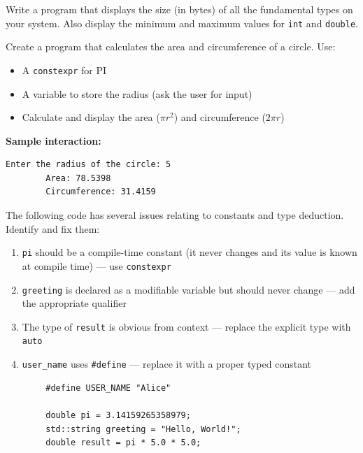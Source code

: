\begin{example}{\leavevmode}
	
	Write a program that displays the size (in bytes) of all the fundamental types on your system. Also display the minimum and maximum values for \texttt{int} and \texttt{double}.
\end{example}

\begin{example}{\leavevmode}
	
	Create a program that calculates the area and circumference of a circle. Use:
	\begin{itemize}
		\item A \texttt{constexpr} for PI
		\item A variable to store the radius (ask the user for input)
		\item Calculate and display the area ($\pi r^2$) and circumference ($2\pi r$)
	\end{itemize}
	
	\textbf{Sample interaction:}
	\begin{lstlisting}[numbers=none]
		Enter the radius of the circle: 5
		Area: 78.5398
		Circumference: 31.4159
	\end{lstlisting}
\end{example}

\begin{example}{\leavevmode}

	The following code has several issues relating to constants and type deduction. Identify and fix them:

	\begin{enumerate}
		\item \texttt{pi} should be a compile-time constant (it never changes and its value is known at compile time) — use \texttt{constexpr}
		\item \texttt{greeting} is declared as a modifiable variable but should never change — add the appropriate qualifier
		\item The type of \texttt{result} is obvious from context — replace the explicit type with \texttt{auto}
		\item \texttt{user\_name} uses \texttt{\#define} — replace it with a proper typed constant
	\end{enumerate}

	\begin{lstlisting}
		#define USER_NAME "Alice"

		double pi = 3.14159265358979;
		std::string greeting = "Hello, World!";
		double result = pi * 5.0 * 5.0;
	\end{lstlisting}
\end{example}

